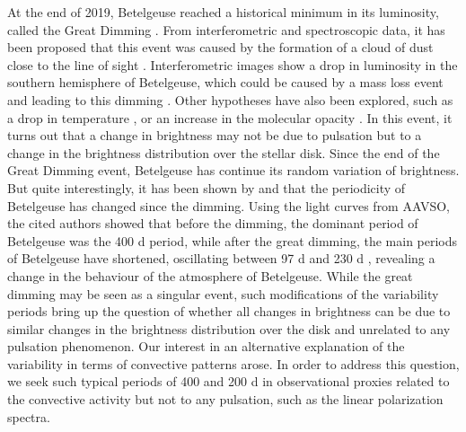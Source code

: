 \documentclass{aa}
\begin{document}


At the end of 2019, Betelgeuse reached a historical minimum in its luminosity, called the Great Dimming \citep{guinan_fall_2020}. 
From interferometric and spectroscopic data, it has been proposed that this event was caused by the formation of a cloud of dust close to the line of sight \citep{montarges_dusty_2021}. 
Interferometric images show a drop in luminosity in the southern hemisphere of Betelgeuse, which could be caused by a mass loss event and leading to this dimming \citep{dupree_great_2022}. Other hypotheses have also been explored, such as a drop in temperature \citep{harper_photospheric_2020}, or an increase in the molecular opacity \citep{kravchenko_atmosphere_2021}. In this event, it turns out that a change in brightness may not be due to pulsation but to a change in the 
brightness distribution over the stellar disk.
Since the end of the Great Dimming event, Betelgeuse has continue its random variation of brightness. 
But quite interestingly, 
it has been shown by \cite{jadlovsky_analysis_2023} and \cite{dupree_great_2022} that the periodicity of Betelgeuse has changed since the dimming. Using the light curves from AAVSO, 
the cited authors showed that before the dimming, the dominant period of Betelgeuse was the 400 d period, while after the great dimming, the main periods of Betelgeuse have shortened, oscillating between 97 d and 230 d \citep{dupree_great_2022}, revealing a change in the behaviour of the atmosphere of Betelgeuse.
While the great dimming may be seen as 
a singular event, such modifications of the variability periods bring up the question of whether all changes in brightness can be due to similar changes in the brightness 
distribution over the disk and unrelated to any pulsation phenomenon. 
Our interest in an alternative explanation of the variability
in terms  of convective patterns arose. In order to address this question, we seek such typical periods of 400 and 200 d in  
observational proxies related to the convective
activity but not to any pulsation, such as the linear polarization
spectra.\\
\end{document}
